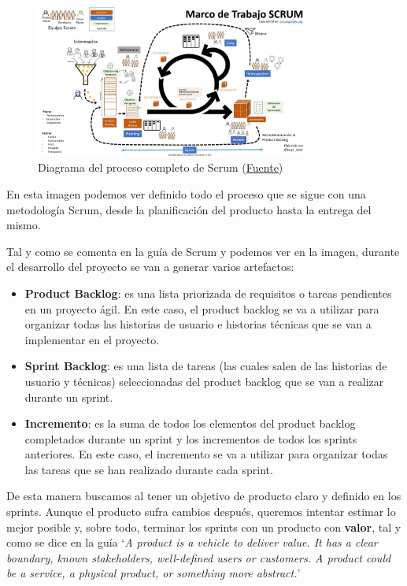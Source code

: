 \begin{figure}[H]
  \centering
  \includegraphics[width=0.8\textwidth]{assets/scrum-diagram.png}
  \caption{Diagrama del proceso completo de Scrum (\href{https://www.lecciones-aprendidas.info/2023/09/diagrama-explicativo-scrum-guia-2020.html}{Fuente})}
  \label{fig:scrum-diagram}
\end{figure}

En esta imagen podemos ver definido todo el proceso que se sigue con una metodología Scrum, desde la planificación del producto hasta la entrega del mismo.

Tal y como se comenta en la guía de Scrum y podemos ver en la imagen, durante el desarrollo del proyecto se van a generar varios artefactos:
\begin{itemize}
    \item \textbf{Product Backlog}: es una lista priorizada de requisitos o tareas pendientes en un proyecto ágil. En este caso, el product backlog se va a utilizar para organizar todas las historias de usuario e historias técnicas que se van a implementar en el proyecto.
    \item \textbf{Sprint Backlog}: es una lista de tareas (las cuales salen de las historias de usuario y técnicas) seleccionadas del product backlog que se van a realizar durante un sprint.
    \item \textbf{Incremento}: es la suma de todos los elementos del product backlog completados durante un sprint y los incrementos de todos los sprints anteriores. En este caso, el incremento se va a utilizar para organizar todas las tareas que se han realizado durante cada sprint.
\end{itemize}
De esta manera buscamos al tener un objetivo de producto claro y definido en los sprints. Aunque el producto sufra cambios después, queremos intentar estimar lo mejor posible y, sobre todo, terminar los sprints con un producto con \textbf{valor}, tal y como se dice en la guía `\textit{A product is a vehicle to deliver value. It has a clear boundary, known stakeholders, well-defined users or customers. A product could be a service, a physical product, or something more abstract.}'


